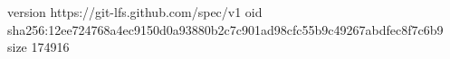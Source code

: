 version https://git-lfs.github.com/spec/v1
oid sha256:12ee724768a4ec9150d0a93880b2c7c901ad98cfc55b9c49267abdfec8f7c6b9
size 174916
